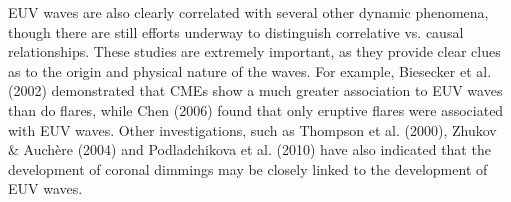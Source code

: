 EUV waves are also clearly correlated with several other dynamic
phenomena, though there are still efforts underway to distinguish
correlative vs. causal relationships.  These studies are extremely
important, as they provide clear clues as to the origin and physical
nature of the waves.  For example, Biesecker et al. (2002)
demonstrated that CMEs show a much greater association to EUV waves
than do flares, while Chen (2006) found that only eruptive flares were
associated with EUV waves.  Other investigations, such as Thompson et
al. (2000), Zhukov & Auchère (2004) and Podladchikova et al. (2010)
have also indicated that the development of coronal dimmings may be
closely linked to the development of EUV waves.
